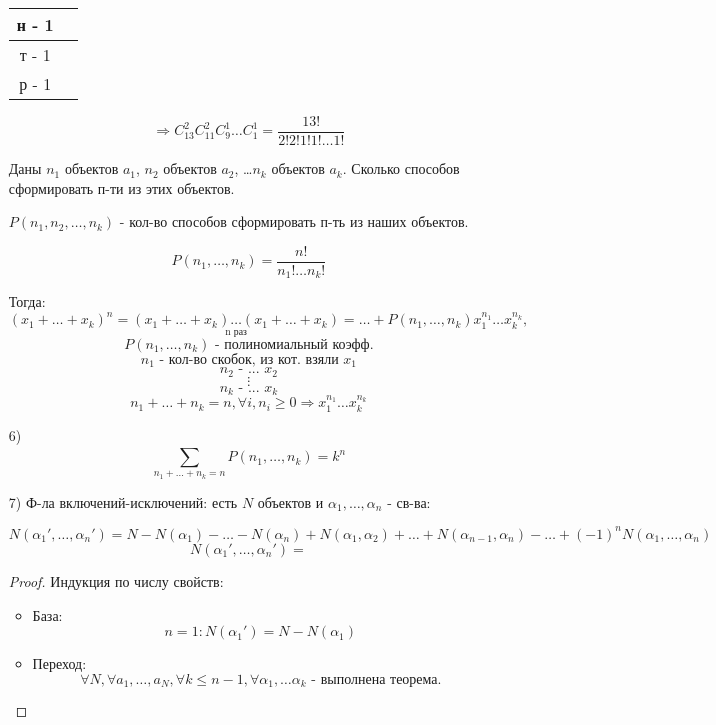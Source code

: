 \begin{itemize}
\begin{solution}
\begin{center}
\begin{tabular}{ |c|c| }
     \hline
     н - 1 \\
     \hline
     т - 1 \\
     \hline
     р - 1 \\
     \hline
    \end{tabular}
    \end{center}
    \[
    \Rightarrow C_{13}^{2}C_{11}^{2}C_{9}^{1}\ldots C_{1}^{1} = \frac{13!}{2!2!1!1!\ldots 1!}
    \]
   \end{solution}
   \begin{task}
   Даны $n_1$ объектов $a_1$, $n_2$ объектов $a_2$, \ldots $n_k$ объектов $a_k$. Сколько способов сформировать п-ти из этих объектов.
   \end{task}
   \begin{solution}
   $P(n_1, n_2, \ldots, n_k)$ - кол-во способов сформировать п-ть из наших объектов.
   \begin{theorem}
     \[
     P(n_1, \ldots, n_k) = \frac{n!}{n_1! \ldots n_k!}
     \]
   \end{theorem}
   \end{solution}
   Тогда:
   \[
     (x_1 + \ldots + x_k)^{n} = \underset{\text{n раз}}{(x_1 + \ldots + x_k) \ldots (x_1 + \ldots + x_k)} = \ldots + P(n_1, \ldots, n_k) x_1^{n_1} \ldots x_k^{n_k}, 
   \]
   \[
   P(n_1, \ldots, n_k) \text{ - полиномиальный коэфф.}
   \]
   \[
   n_1 \text{ - кол-во скобок, из кот. взяли $x_1$}
   \]
   \[
   n_2 \text{ - ... $x_2$}
   \]
   \[
   \vdots
   \]
   \[
   n_k \text{ - ... $x_k$}
   \]
   \[
   n_1 + \ldots + n_k = n, \forall i, n_i \geq 0 \Rightarrow x_1^{n_1}\ldots x_k^{n_k}
   \]
 \item [6) ] \[
 \sum_{n_1 + \ldots + n_k = n}^{}P(n_1, \ldots, n_k) = k^{n}
 \]
\item [7) ] Ф-ла включений-исключений: есть $N$ объектов и $\alpha_1, \ldots, \alpha_n$ - св-ва:
  \begin{theorem}
  \[
  N(\alpha_1', \ldots, \alpha_n') = N - N(\alpha_1) - \ldots - N(\alpha_n) + N(\alpha_1, \alpha_2) + \ldots + N(\alpha_{n - 1}, \alpha_n) - \ldots + (-1)^{n}N(\alpha_1, \ldots, \alpha_n)
  \]
  \[
  N(\alpha_1', \ldots, \alpha_n') = 
  \]
  \end{theorem}
  \begin{proof}
  Индукция по числу свойств:
  \begin{itemize}
    \item База: 
      \[
      n = 1 \colon N(\alpha_1') = N - N(\alpha_1)
      \]
    \item Переход:
      \[
      \forall N, \forall a_1, \ldots, a_N, \forall k \leq n - 1, \forall \alpha_1, \ldots \alpha_k \text{ - выполнена теорема.}
\]
\end{itemize}
\end{proof}
\end{itemize}
